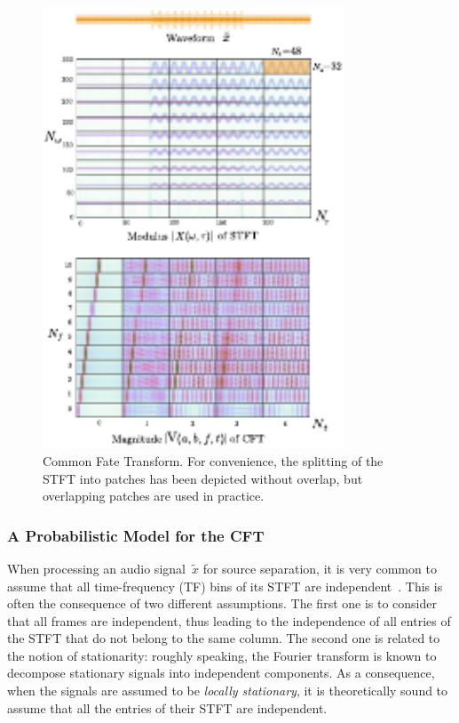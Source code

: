 \begin{figure}[t]
\centering
\includegraphics[width=0.8\textwidth]{Chapters/06_Separation_Unknown/figures/CFT}
\caption{Common Fate Transform. For convenience, the splitting of the STFT
into patches has been depicted without overlap, but overlapping patches are used in practice\label{fig:CFT}.}
\end{figure}

\subsubsection{A Probabilistic Model for the CFT}

\label{ssub:separation}

When processing an audio signal~$\tilde{x}$ for source separation,
it is very common to assume that all time-frequency (TF) bins
of its STFT are independent~\cite{fevotte09, duong10, ozerov12, liutkus11t}.
This is often the consequence of two different assumptions.
The first one is to consider that all frames are independent, thus
leading to the independence of all entries of the STFT that do not belong to the
same column. The second one is related to the notion of stationarity:
roughly speaking, the Fourier transform is known to decompose stationary
signals into independent components.
As a consequence, when the signals are assumed to be \emph{locally stationary},
it is theoretically sound to assume that all the entries of
their STFT are independent.

